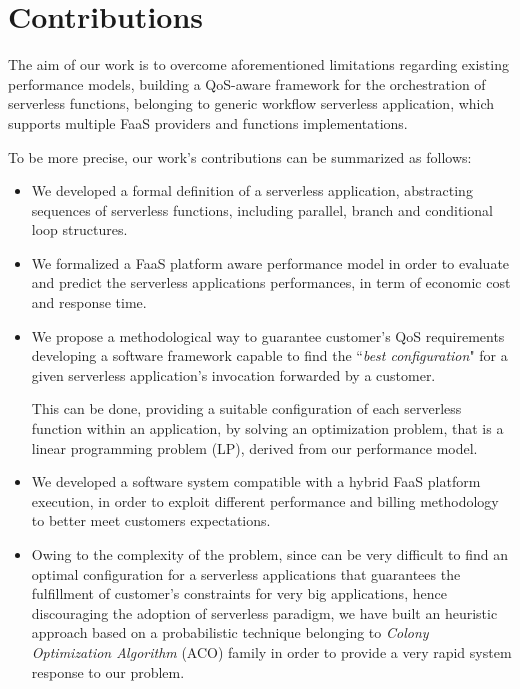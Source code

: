 \documentclass[12pt,a4paper]{report}
\newcommand{\ItalicQuotMark}[1]{``\textit{#1}"}
\begin{document}
\section{Contributions}

The aim of our work is to overcome aforementioned limitations regarding existing performance models, building a QoS-aware framework for the orchestration of serverless functions, belonging to generic workflow serverless application, which supports multiple FaaS providers and functions implementations.

To be more precise, our work's contributions can be summarized as follows:

\begin{itemize}
	\item We developed a formal definition of a serverless application, abstracting sequences of serverless functions, including parallel, branch and conditional loop structures.
	
	\item We formalized a FaaS platform aware performance model in order to evaluate and predict the serverless applications performances, in term of economic cost and response time.
		
	\item We propose a methodological way to guarantee customer's QoS requirements developing a software framework capable to find the \ItalicQuotMark{best configuration} for a given serverless application's invocation forwarded by a customer.
		
	This can be done, providing a suitable configuration of each serverless function within an application, by solving an optimization problem, that is a linear programming problem (LP), derived from our performance model.
	
	\item We developed a software system compatible with a hybrid FaaS platform execution, in order to exploit different performance and billing methodology to better meet customers expectations.
	

	\item Owing to the complexity of the problem, since can be very difficult to find an optimal configuration for a serverless applications that guarantees the fulfillment of customer's constraints for very big applications, hence discouraging the adoption of serverless paradigm, we have built an heuristic approach based on a probabilistic technique belonging to \textit{Colony Optimization Algorithm} (ACO) family in order to provide a very rapid system response to our problem.
	

\end{itemize}
\end{document}
